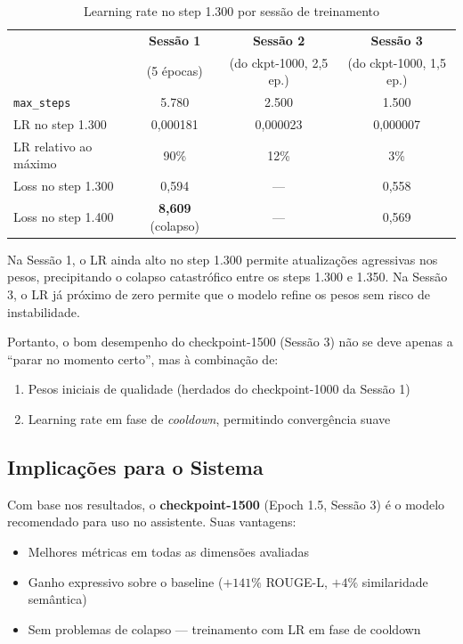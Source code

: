 \begin{table}[H]
\centering
\caption{Learning rate no step 1.300 por sessão de treinamento}
\label{tab:lr-comparacao}
\begin{tabular}{lccc}
\toprule
& \textbf{Sessão 1} & \textbf{Sessão 2} & \textbf{Sessão 3} \\
& (5 épocas) & (do ckpt-1000, 2,5 ep.) & (do ckpt-1000, 1,5 ep.) \\
\midrule
\texttt{max\_steps}   & 5.780     & 2.500   & 1.500 \\
LR no step 1.300       & 0,000181  & 0,000023 & 0,000007 \\
LR relativo ao máximo  & 90\%      & 12\%     & 3\% \\
Loss no step 1.300     & 0,594     & ---      & 0,558 \\
Loss no step 1.400     & \textbf{8,609} (colapso) & --- & 0,569 \\
\bottomrule
\end{tabular}
\end{table}

Na Sessão 1, o LR ainda alto no step 1.300 permite atualizações agressivas nos pesos, precipitando o colapso catastrófico entre os steps 1.300 e 1.350. Na Sessão 3, o LR já próximo de zero permite que o modelo refine os pesos sem risco de instabilidade.

Portanto, o bom desempenho do checkpoint-1500 (Sessão 3) não se deve apenas a ``parar no momento certo'', mas à combinação de:
\begin{enumerate}
    \item Pesos iniciais de qualidade (herdados do checkpoint-1000 da Sessão 1)
    \item Learning rate em fase de \textit{cooldown}, permitindo convergência suave
\end{enumerate}

\subsection{Implicações para o Sistema}

Com base nos resultados, o \textbf{checkpoint-1500} (Epoch 1.5, Sessão 3) é o modelo recomendado para uso no assistente. Suas vantagens:

\begin{itemize}
    \item Melhores métricas em todas as dimensões avaliadas
    \item Ganho expressivo sobre o baseline ($+141\%$ ROUGE-L, $+4\%$ similaridade semântica)
    \item Sem problemas de colapso --- treinamento com LR em fase de cooldown
\end{itemize}

